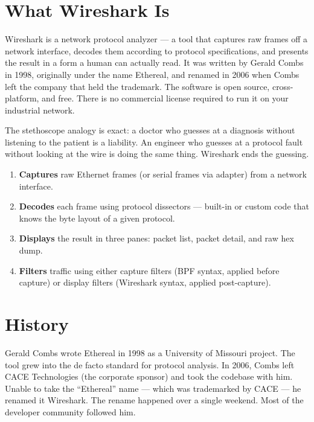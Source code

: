 \documentclass[12pt,twoside,openright]{memoir}
\begin{document}
\section{What Wireshark Is}

Wireshark is a network protocol analyzer --- a tool that captures raw frames off a network interface, decodes them according to protocol specifications, and presents the result in a form a human can actually read. It was written by Gerald Combs in 1998, originally under the name Ethereal, and renamed in 2006 when Combs left the company that held the trademark. The software is open source, cross-platform, and free. There is no commercial license required to run it on your industrial network.

The stethoscope analogy is exact: a doctor who guesses at a diagnosis without listening to the patient is a liability. An engineer who guesses at a protocol fault without looking at the wire is doing the same thing. Wireshark ends the guessing.

\begin{keyconcept}[title={What Wireshark Actually Does}]
\begin{enumerate}[noitemsep]
  \item \textbf{Captures} raw Ethernet frames (or serial frames via adapter) from a network interface.
  \item \textbf{Decodes} each frame using protocol dissectors --- built-in or custom code that knows the byte layout of a given protocol.
  \item \textbf{Displays} the result in three panes: packet list, packet detail, and raw hex dump.
  \item \textbf{Filters} traffic using either capture filters (BPF syntax, applied before capture) or display filters (Wireshark syntax, applied post-capture).
\end{enumerate}
\end{keyconcept}

\section{History}

Gerald Combs wrote Ethereal in 1998 as a University of Missouri project. The tool grew into the de facto standard for protocol analysis. In 2006, Combs left CACE Technologies (the corporate sponsor) and took the codebase with him. Unable to take the ``Ethereal'' name --- which was trademarked by CACE --- he renamed it Wireshark. The rename happened over a single weekend. Most of the developer community followed him.
\end{document}
